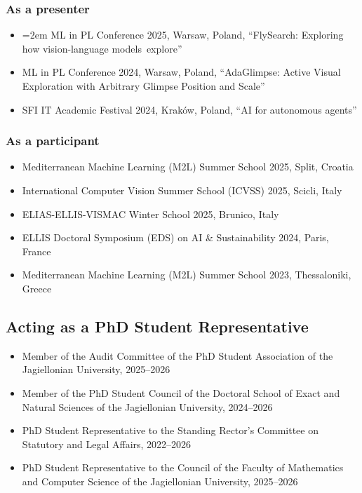 \subsubsection{As a presenter}
\begin{itemize}
    \item {\emergencystretch=2em ML in PL Conference 2025, Warsaw, Poland, ``FlySearch: Exploring how vision-language \mbox{models explore}''\par}
    \item ML in PL Conference 2024, Warsaw, Poland, ``AdaGlimpse: Active Visual Exploration with Arbitrary Glimpse Position and Scale''
    \item SFI IT Academic Festival 2024, Kraków, Poland, ``AI for autonomous agents''
\end{itemize}

\subsubsection{As a participant}
\begin{itemize}
    \item Mediterranean Machine Learning (M2L) Summer School 2025, Split, Croatia
    \item International Computer Vision Summer School (ICVSS) 2025, Scicli, Italy
    \item ELIAS-ELLIS-VISMAC Winter School 2025, Brunico, Italy
    \item ELLIS Doctoral Symposium (EDS) on AI \& Sustainability 2024, Paris, France
    \item Mediterranean Machine Learning (M2L) Summer School 2023, Thessaloniki, Greece
\end{itemize}

\subsection{Acting as a PhD Student Representative}
\begin{itemize}
    \item Member of the Audit Committee of the PhD Student Association of the Jagiellonian University, 2025--2026
    \item Member of the PhD Student Council of the Doctoral School of Exact and Natural Sciences of the Jagiellonian University, 2024--2026
    \item PhD Student Representative to the Standing Rector's Committee on Statutory and Legal Affairs, 2022--2026
    \item PhD Student Representative to the Council of the Faculty of Mathematics and Computer Science of the Jagiellonian University, 2025--2026
\end{itemize}
